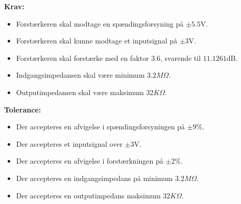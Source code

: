 \noindent\textbf{Krav:}
\begin{itemize}
	\item Forstærkeren skal modtage en spændingsforsyning på $\pm5.5$V.
	\item Forstærkeren skal kunne modtage et inputsignal på $\pm3$V.
	\item Forstærkeren skal forstærke med en faktor $3.6$, svarende til $11.1261$dB.
	\item Indgangsimpedansen skal være minimum $3.2M\Omega$.
	\item Outputimpedansen skal være maksimum $32K\Omega$.
\end{itemize}
\noindent\textbf{Tolerance:}
\begin{itemize}
	\item Der accepteres en afvigelse i spændingsforsyningen på $\pm9\%$.
	\item Der accepteres et inputsignal over $\pm3$V.
	\item Der accepteres en afvigelse i forstærkningen på $\pm2\%$.
	\item Der accepteres en indgangsimpedans på minimum $3.2M\Omega$.
	\item Der accepteres en outputimpedans maksimum $32K\Omega$.
\end{itemize}
